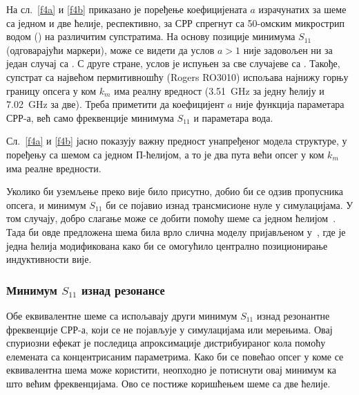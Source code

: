 На сл.~\ref{f4a} и \ref{f4b} приказано је поређење коефицијената $a$ израчунатих за шеме са једном и две ћелије, респективно, за СРР спрегнут са 50-омским микрострип водом () на различитим супстратима. На основу позиције минимума $S_{11}$ (одговарајући маркери), може се видети да услов $a>1$ није задовољен ни за један случај са . С друге стране, услов је испуњен за све случајеве са . Такође, супстрат са највећом пермитивношћу (Rogers RO3010) испољава најнижу горњу границу опсега у ком $k_m$ има реалну вредност (\SI{3.51}{\giga\hertz} за једну ћелију и \SI{7.02}{\giga\hertz} за две). Треба приметити да коефицијент $a$ није функција параметара СРР-а, већ само фреквенције минимума $S_{11}$ и параметара вода.

Сл.~\ref{f4a} и \ref{f4b} јасно показују важну предност унапређеног модела структуре, у поређењу са шемом са једном П-ћелијом, а то је два пута већи опсег у ком $k_m$ има реалне вредности.

Уколико би уземљење преко вије било присутно, добио би се одзив пропусника опсега, и минимум $S_{11}$ би се појавио изнад трансмисионе нуле у симулацијама. У том случају, добро слагање може се добити помоћу шеме са једном ћелијом~\cite{bib16}. Тада би овде предложена шема била врло слична моделу пријављеном у~\cite{aznar_improved}, где је једна ћелија модификована како би се омогућило централно позиционирање индуктивности вије.

\subsubsection{Минимум $S_{11}$ изнад резонансе}

Обе еквивалентне шеме са  испољавају други минимум $S_{11}$ изнад резонантне фреквенције СРР-а, који се не појављује у симулацијама или мерењима. Овај спуриозни ефекат је последица апроксимације дистрибуираног кола помоћу елемената са концентрисаним параметрима. Како би се повећао опсег у коме се еквивалентна шема може користити, неопходно је потиснути овај минимум ка што већим фреквенцијама. Ово се постиже коришћењем шеме са две ћелије.

